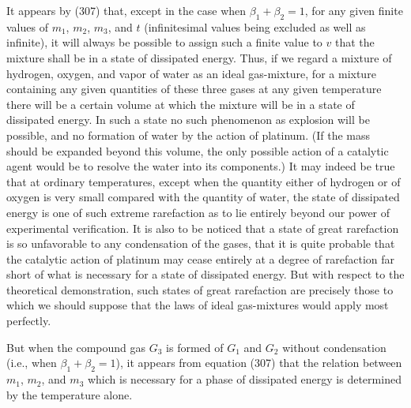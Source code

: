\documentclass[12pt]{article}
\begin{document}
It appears by (307) that, except in the case when $\beta_1+\beta_2=1$, for any given finite values of $m_1$, $m_2$, $m_3$, and $t$ (infinitesimal values being excluded as well as infinite), it will always be possible to assign such a finite value to $v$ that the mixture shall be in a state of dissipated energy. 
Thus, if we regard a mixture of hydrogen, oxygen, and vapor of water as an ideal gas-mixture, for a mixture containing any given quantities of these three gases at any given temperature there will be a certain volume at which the mixture will be in a state of dissipated energy. 
In such a state no such phenomenon as explosion will be possible, and no formation of water by the action of platinum. (If the mass should be expanded beyond this volume, the only possible action of a catalytic agent would be to resolve the water into its components.) It may indeed be true that at ordinary temperatures, except when the quantity either of hydrogen or of oxygen is very small compared with the quantity of water, the state of dissipated energy is one of such extreme rarefaction as to lie entirely beyond our power of experimental verification. It is also to be noticed that a state of great rarefaction is so unfavorable to any condensation of the gases, that it is quite probable that the catalytic action of platinum may cease entirely at a degree of rarefaction far short of what is necessary for a state of dissipated energy. But with respect to the theoretical demonstration, such states of great rarefaction are precisely those to which we should suppose that the laws of ideal gas-mixtures would apply most perfectly.


But when the compound gas $G_3$ is formed of $G _1$ and $G_2$ without condensation (i.e., when $\beta_1+\beta_2=1$), it appears from equation (307) that the relation between $m_1$, $m_2$, and $m_3$ which is necessary for a phase of dissipated energy is determined by the temperature alone.
\end{document}
